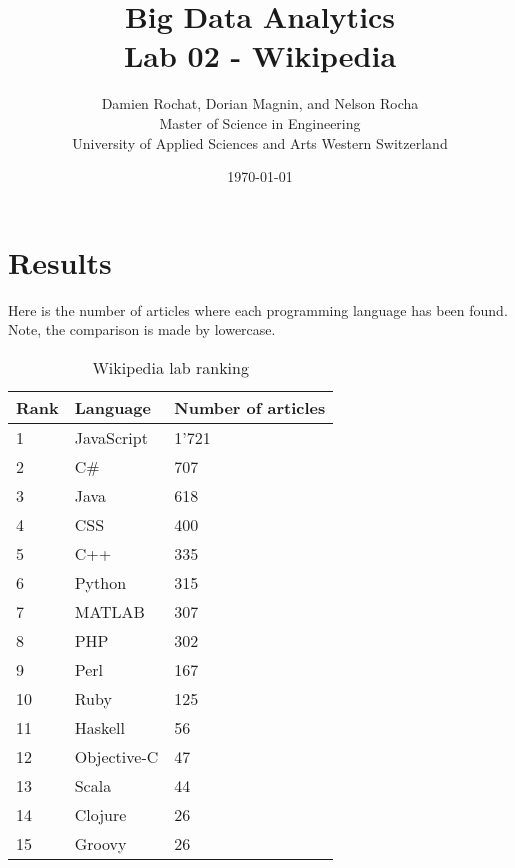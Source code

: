 \documentclass[a4paper]{article}
\title{
	Big Data Analytics \\
	Lab 02 - Wikipedia}
\author{
	Damien Rochat, Dorian Magnin, and Nelson Rocha \\
	Master of Science in Engineering \\
	University of Applied Sciences and Arts Western Switzerland}
\date{\today}
\begin{document}
	\maketitle
	
	\section{Results}
	Here is the number of articles where each programming language has been found. Note, the comparison is made by lowercase.

	\begin{table}[H]
		\begin{minipage}{0.5\textwidth}
			\centering

			\begin{tabular}{|l|l|l|}
				\hline
				\textbf{Rank}  & \textbf{Language}  & \textbf{Number of articles} \\ \hline
				1              & JavaScript         & 1'721                       \\ \hline
				2              & C\#                & 707                         \\ \hline
				3              & Java               & 618                         \\ \hline
				4              & CSS                & 400                         \\ \hline
				5              & C++                & 335                         \\ \hline
				6              & Python             & 315                         \\ \hline
				7              & MATLAB             & 307                         \\ \hline
				8              & PHP                & 302                         \\ \hline
				9              & Perl               & 167                         \\ \hline
				10             & Ruby               & 125                         \\ \hline
				11             & Haskell            & 56                          \\ \hline
				12             & Objective-C        & 47                          \\ \hline
				13             & Scala              & 44                          \\ \hline
				14             & Clojure            & 26                          \\ \hline
				15             & Groovy             & 26                          \\ \hline
			\end{tabular}
			\caption{Wikipedia lab ranking}


\end{minipage}
\end{table}
\end{document}
